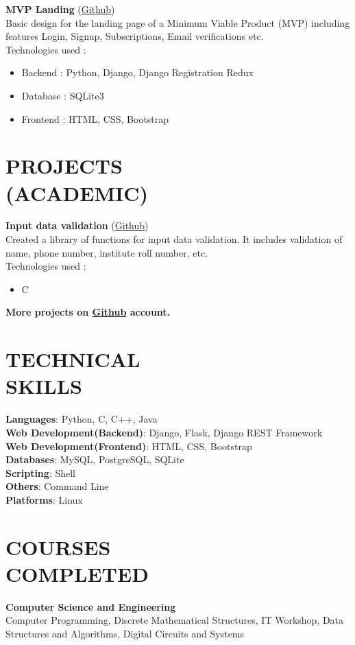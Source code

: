 \documentclass[margin]{res}
\begin{document}
\begin{resume}
   {\textbf{MVP Landing}} (\href{https://github.com/gauravkulkarni96/sample-django-project}{Github})\\
    Basic design for the landing page of a Minimum Viable Product (MVP) including features Login, Signup, Subscriptions, Email verifications etc.\\
Technologies used :
    \begin{itemize} \itemsep -2pt
     \item Backend : Python, Django, Django Registration Redux
     \item Database : SQLite3
     \item Frontend : HTML, CSS, Bootstrap
     \end{itemize}

\section{PROJECTS\\(ACADEMIC)}
   {\textbf{Input data validation}} (\href{https://github.com/gauravkulkarni96/data-validation}{Github})\\
    Created a library of functions for input data validation. It includes validation of name, phone number, institute roll number, etc.\\
Technologies used :
    \begin{itemize} \itemsep -2pt
     \item C
     \end{itemize}
 \textbf{More projects on \href{https://github.com/gauravkulkarni96}{Github} account.}


\section{TECHNICAL \\ SKILLS} {\textbf{Languages}:} Python, C, C++, Java\\
	{\textbf{Web Development(Backend)}:} Django, Flask, Django REST Framework\\
    {\textbf{Web Development(Frontend)}:} HTML, CSS, Bootstrap\\
    {\textbf{Databases}:} MySQL, PostgreSQL, SQLite\\
    {\textbf{Scripting}:} Shell\\
    {\textbf{Others}:} Command Line\\
    {\textbf{Platforms}:} Linux

\newpage

\section{COURSES \\ COMPLETED} {\textbf{Computer Science and Engineering}}\\
Computer Programming, Discrete Mathematical Structures, IT Workshop, Data Structures and Algorithms, Digital Circuits and Systems\\


\end{resume}
\end{document}
